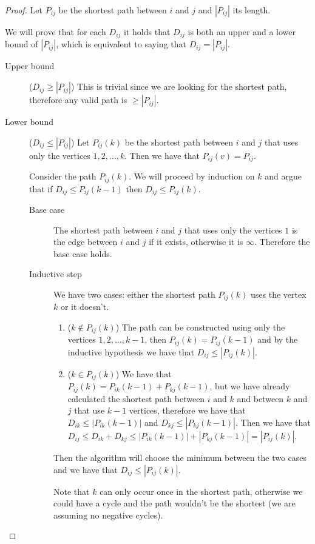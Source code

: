 \documentclass[12pt]{extarticle}
\begin{document}
\begin{proof}
    Let $P_{ij}$ be the shortest path between $i$ and $j$ and $|P_{ij}|$ its length.

    We will prove that for each $D_{ij}$ it holds that $D_{ij}$ is both an upper and a lower bound of $|P_{ij}|$, which is equivalent to saying that $D_{ij} = |P_{ij}|$.
    \begin{description}
        \item[Upper bound] ($D_{ij} \geq |P_{ij}|$)
            This is trivial since we are looking for the shortest path, therefore any valid path is $\geq |P_{ij}|$.
        \item[Lower bound] ($D_{ij} \leq |P_{ij}|$)
            Let $P_{ij}(k)$ be the shortest path between $i$ and $j$ that uses only the vertices $1, 2, \ldots, k$.
            Then we have that $P_{ij}(v) = P_{ij}$.

            Consider the path $P_{ij}(k)$.
            We will proceed by induction on $k$ and argue that if $D_{ij} \leq P_{ij}(k-1)$ then $D_{ij} \leq P_{ij}(k)$.

            \begin{description}
                \item[Base case] The shortest path between $i$ and $j$ that uses only the vertices $1$ is the edge between $i$ and $j$ if it exists, otherwise it is $\infty$. Therefore the base case holds.
                \item[Inductive step]
                    We have two cases: either the shortest path $P_{ij}(k)$ uses the vertex $k$ or it doesn't.

                    \begin{enumerate}[label=\roman*.]
                        \item ($k \notin P_{ij}(k)$)
                              The path can be constructed using only the vertices $1, 2, \ldots, k-1$, then $P_{ij}(k) = P_{ij}(k-1)$ and by the inductive hypothesis we have that $D_{ij} \leq |P_{ij}(k)|$.

                        \item ($k \in P_{ij}(k)$)
                              We have that $P_{ij}(k) = P_{ik}(k-1) + P_{kj}(k-1)$, but we have already calculated the shortest path between $i$ and $k$ and between $k$ and $j$ that use $k-1$ vertices, therefore we have that $D_{ik} \leq |P_{ik}(k-1)|$ and $D_{kj} \leq |P_{kj}(k-1)|$.
                              Then we have that $D_{ij} \leq D_{ik} + D_{kj} \leq |P_{ik}(k-1)| + |P_{kj}(k-1)| = |P_{ij}(k)|$.

                    \end{enumerate}

                    Then the algorithm will choose the minimum between the two cases and we have that $D_{ij} \leq |P_{ij}(k)|$.

                    Note that $k$ can only occur once in the shortest path, otherwise we could have a cycle and the path wouldn't be the shortest (we are assuming no negative cycles).
            \end{description}

    \end{description}

\end{proof}
\end{document}
